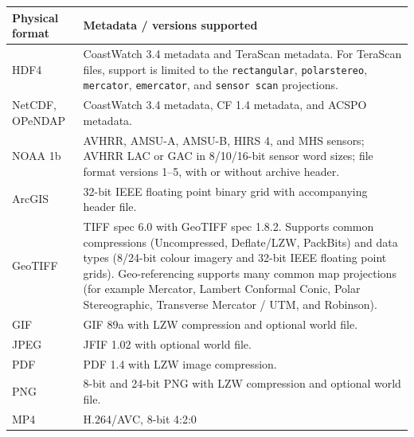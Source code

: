 \medskip
\begin{tabular}{|l|p{10cm}|}
\hline
\textbf{Physical format} & \textbf{Metadata / versions supported} \\ \hline

HDF4 & CoastWatch 3.4 metadata and TeraScan metadata. For TeraScan files, support
is limited to the {\tt rectangular}, {\tt polarstereo}, {\tt mercator}, 
{\tt emercator}, and {\tt sensor\ scan} projections. \\ \hline

NetCDF, OPeNDAP & CoastWatch 3.4 metadata, CF 1.4 metadata, and ACSPO metadata. \\ \hline

NOAA 1b & AVHRR, AMSU-A, AMSU-B, HIRS 4, and MHS sensors; AVHRR LAC or GAC in 8/10/16-bit
sensor word sizes; file format versions 1--5, with or without archive header. \\ \hline

ArcGIS & 32-bit IEEE floating point binary grid with accompanying header file. \\ \hline

GeoTIFF & TIFF spec 6.0 with GeoTIFF spec 1.8.2. Supports common compressions
(Uncompressed, Deflate/LZW, PackBits) and data types (8/24-bit colour imagery and
32-bit IEEE floating point grids). Geo-referencing supports many common map
projections (for example Mercator, Lambert Conformal Conic, Polar Stereographic,
Transverse Mercator / UTM, and Robinson). \\ \hline

GIF & GIF 89a with LZW compression and optional world file. \\ \hline

JPEG & JFIF 1.02 with optional world file. \\ \hline

PDF & PDF 1.4 with LZW image compression. \\ \hline

PNG & 8-bit and 24-bit PNG with LZW compression and optional world file. \\ \hline

MP4 & H.264/AVC, 8-bit 4:2:0 \\ \hline

\end{tabular}

